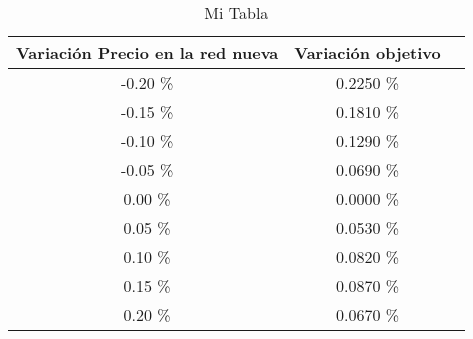 \begin{table}
\centering
\begin{tabular}{|c|c|c|}
\hline
 Variación Precio en la red nueva & Variación objetivo \\ \hline
-0.20 \% & 0.2250 \% \\ \hline
-0.15 \% & 0.1810 \% \\ \hline
-0.10 \% & 0.1290 \% \\ \hline
-0.05 \% & 0.0690 \% \\ \hline
0.00 \% & 0.0000 \% \\ \hline
0.05 \% & 0.0530 \% \\ \hline
0.10 \% & 0.0820 \% \\ \hline
0.15 \% & 0.0870 \% \\ \hline
0.20 \% & 0.0670 \% \\ \hline
\end{tabular}
\caption{Mi Tabla}
\end{table}
